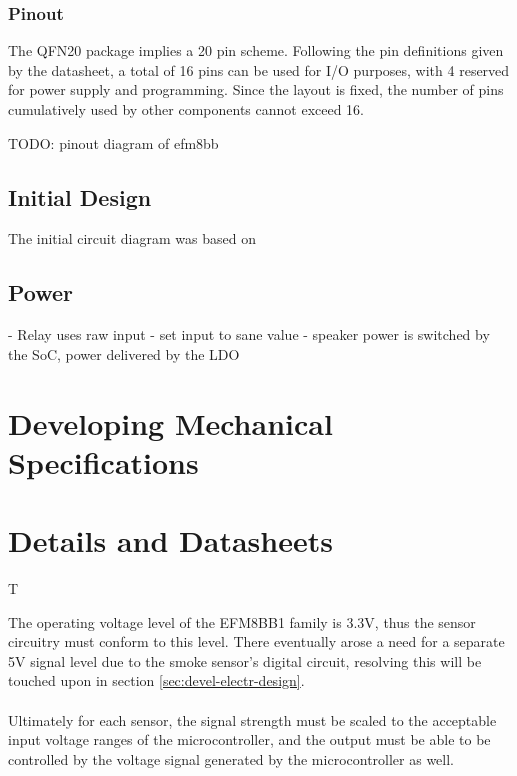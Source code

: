 \documentclass[12pt]{article}
\begin{document}
  
  \subsubsection{Pinout}
  The QFN20 package implies a 20 pin scheme. Following the pin definitions given by the datasheet, a total of 16 pins can be used for I/O purposes, with 4 reserved for power supply and programming. Since the layout is fixed, the number of pins cumulatively used by other components cannot exceed 16.

   

  TODO: pinout diagram of efm8bb

  \subsection{Initial Design}

  The initial circuit diagram was based on 

	\subsection{Power}
  

  - Relay uses raw input - set input to sane value
  - speaker power is switched by the SoC, power delivered by the LDO
	
	\section{Developing Mechanical Specifications}
	
	\section{Details and Datasheets}
  T

  The operating voltage level of the EFM8BB1 family is 3.3V, thus the sensor circuitry must conform to this level. There eventually arose a need for a separate 5V signal level due to the smoke sensor's digital circuit, resolving this will be touched upon in section \ref{sec:devel-electr-design}.

  \paragraph{}
  Ultimately for each sensor, the signal strength must be scaled to the acceptable input voltage ranges of the microcontroller, and the output must be able to be controlled by the voltage signal generated by the microcontroller as well.
\end{document}
